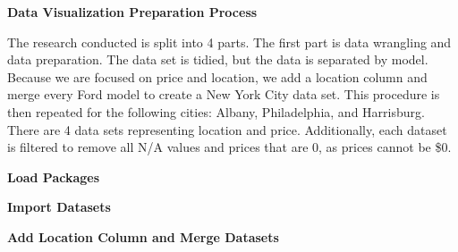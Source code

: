 \documentclass[
]{article}
\begin{document}
\textbf{Data Visualization Preparation Process}

The research conducted is split into 4 parts. The first part is data
wrangling and data preparation. The data set is tidied, but the data is
separated by model. Because we are focused on price and location, we add
a location column and merge every Ford model to create a New York City
data set. This procedure is then repeated for the following cities:
Albany, Philadelphia, and Harrisburg. There are 4 data sets representing
location and price. Additionally, each dataset is filtered to remove all
N/A values and prices that are 0, as prices cannot be \$0.

\textbf{Load Packages}

\textbf{Import Datasets}

\textbf{Add Location Column and Merge Datasets}
\end{document}
